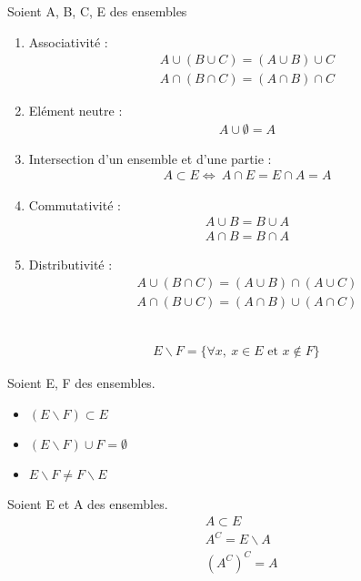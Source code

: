 \begin{proposition} Soient A, B, C, E des ensembles
	\begin{enumerate}
		\item Associativité :
		\begin{align*}
			A \cup (B \cup C) = (A \cup B) \cup C \\
			A \cap (B \cap C) = (A \cap B) \cap C
		\end{align*}
		\item Elément neutre : 
		\begin{align*}
			A \cup \emptyset = A
		\end{align*}
		\item Intersection d'un ensemble et d'une partie :
		\begin{align*}
			A \subset E \iff \ A \cap E = E \cap A = A
		\end{align*}
		\item Commutativité :
		\begin{align*}
			A \cup B = B \cup A \\
			A \cap B = B \cap A
		\end{align*}
		\item Distributivité :
		\begin{align*}
			A \cup (B \cap C) = (A \cup B) \cap (A \cup C) \\
			A \cap (B \cup C) = (A \cap B) \cup (A \cap C)
		\end{align*}
	\end{enumerate}
\end{proposition}

\begin{definition}~
	\begin{align*}
		E \backslash F = \{\forall x,\ x \in E \text{ et } x \notin F \}
	\end{align*}
\end{definition}
\begin{remarque}Soient E, F des ensembles.
	\begin{itemize}
		\item $(E \backslash F) \subset E$
		\item $(E \backslash F) \cup F = \emptyset$
		\item $E \backslash F \neq F \backslash E$
	\end{itemize}
\end{remarque}
\begin{remarque}Soient E et A des ensembles.
	\begin{align*}
		&A \subset E \\
		&A^C = E \backslash A \\
		&(A^C)^C = A
	\end{align*}
\end{remarque}

